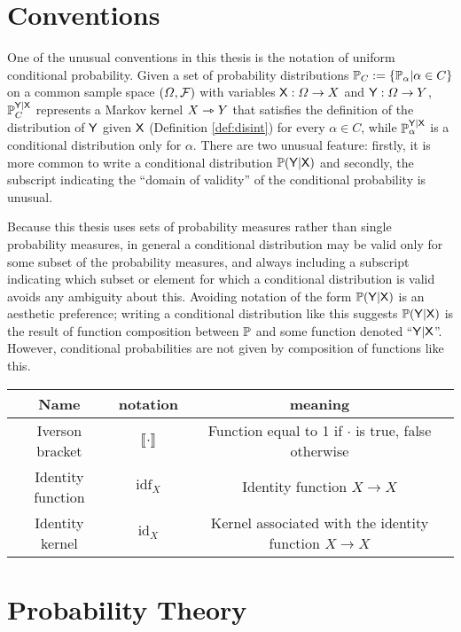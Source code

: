 \section{Conventions}

One of the unusual conventions in this thesis is the notation of uniform conditional probability. Given a set of probability distributions $\mathbb{P}_C:=\{\mathbb{P}_\alpha|\alpha\in C\}$ on a common sample space $(\Omega,\mathcal{F})$ with variables $\mathsf{X}:\Omega\to X$ and $\mathsf{Y}:\Omega\to Y$, $\mathbb{P}^{\mathsf{Y}|\mathsf{X}}_C$ represents a Markov kernel $X\rightarrowtriangle Y$ that satisfies the definition of the distribution of $\mathsf{Y}$ given $\mathsf{X}$ (Definition \ref{def:disint}) for every $\alpha\in C$, while $\mathbb{P}_\alpha^{\mathsf{Y}|\mathsf{X}}$ is a conditional distribution only for $\alpha$. There are two unusual feature: firstly, it is more common to write a conditional distribution $\mathbb{P}(\mathsf{Y}|\mathsf{X})$ and secondly, the subscript indicating the ``domain of validity'' of the conditional probability is unusual.

Because this thesis uses sets of probability measures rather than single probability measures, in general a conditional distribution may be valid only for some subset of the probability measures, and always including a subscript indicating which subset or element for which a conditional distribution is valid avoids any ambiguity about this. Avoiding notation of the form $\mathbb{P}(\mathsf{Y}|\mathsf{X})$ is an aesthetic preference; writing a conditional distribution like this suggests $\mathbb{P}(\mathsf{Y}|\mathsf{X})$ is the result of function composition between $\mathbb{P}$ and some function denoted ``$\mathsf{Y}|\mathsf{X}$''. However, conditional probabilities are not given by composition of functions like this.

\begin{center}
\begin{tabular}{ |c|c|c| } 
 \hline
 Name & notation & meaning \\
 \hline
 Iverson bracket & $\llbracket \cdot \rrbracket$ & Function equal to 1 if $\cdot$ is true, false otherwise \\ 
 Identity function & $\mathrm{idf}_X$ & Identity function $X\to X$\\
 Identity kernel & $\mathrm{id}_{X}$ & Kernel associated with the identity function $X\to X$\\
 \hline
\end{tabular}
\end{center}

\section{Probability Theory}

